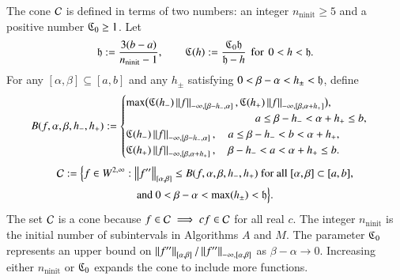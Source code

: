 \documentclass[review]{elsarticle}
\theoremstyle{definition}
\renewcommand{\cw}{W}
\DeclareMathOperator{\ninit}{ninit}
\begin{document}
The cone $\cc$ is defined in terms of two numbers: an integer $n_{\ninit} \ge 5$
and a positive number $\fC_0 \ge 1$. Let
\begin{equation}
\label{hCdef}
\fh := \frac{3(b-a)}{n_{\ninit}-1}, \qquad \fC(h) := \frac{\fC_0 \fh}{\fh - h} 
\mbox{\, for \,} 0<h<\fh.
\end{equation}
For any $[\alpha, \beta] \subseteq [a,b]$ and any $h_{\pm}$ satisfying $0 <
\beta - \alpha < h_{\pm} < \fh$, define
\begin{equation} \label{tbdef}
B(f,\alpha,\beta,h_-,h_+) :=
\begin{cases}
   \max\bigl(\fC(h_{-}) \norm[-\infty,{[\beta-h_-,\alpha]}]{f},\fC(h_{+}) 
   \norm[-\infty,{[\beta, \alpha+h_+]}]{f}\bigr), 
\\                                             \hspace{26ex} a \le \beta- h_- <  \alpha + h_+ \le b,
\\ \fC(h_{-}) \norm[-\infty,{[\beta-h_-,\alpha]}]{f},  \quad a \le \beta- h_- < b< \alpha + h_+,
\\ \fC(h_{+}) \norm[-\infty,{[\beta, \alpha+h_+]}]{f}, 
\quad \beta- h_- <  a  < \alpha + h_+ \le b.
\end{cases} 
\end{equation}
\begin{multline} \label{conedef}
 \cc := \Bigl \{
 f  \in    \cw^{2,\infty}:   \norm[{[\alpha,\beta]}]{f''}  \le B(f,\alpha,\beta,h_-,h_+)  
 \text{ for all } [\alpha,\beta] \subset [a,b],
\\ \text{and } 0 < \beta - \alpha < \max(h_{\pm}) < \fh  \Bigr \}.
\end{multline}
The set $\cc$ is a cone because $f \in \cc \implies cf \in \cc$ for all real
$c$. The integer $n_{\ninit}$ is the initial number of subintervals in
Algorithms $A$ and $M$. The parameter $\fC_0$ represents an upper bound on
$\norm[{[\alpha,\beta]}]{f''}/\norm[-\infty,{[\alpha,\beta]}]{f''}$ as $\beta -
\alpha \to 0$. Increasing either $n_{\ninit}$ or $\fC_0$ expands the cone to
include more functions.
\end{document}
